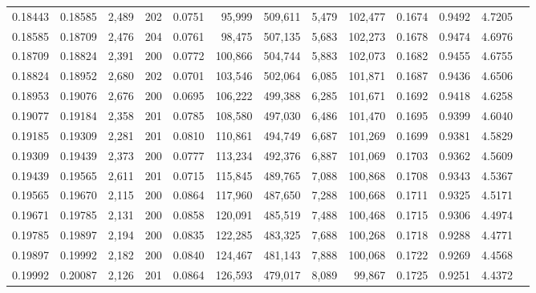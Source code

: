 \begin{tabular}{rrrrrrrrrrrrr}
0.18443 & 0.18585 & 2,489 & 202 &                                     0.0751 &  95,999 & 509,611 &   5,479 & 102,477 & 0.1674 & 0.9492 & 4.7205 \\
0.18585 & 0.18709 & 2,476 & 204 &                                     0.0761 &  98,475 & 507,135 &   5,683 & 102,273 & 0.1678 & 0.9474 & 4.6976 \\
0.18709 & 0.18824 & 2,391 & 200 &                                     0.0772 & 100,866 & 504,744 &   5,883 & 102,073 & 0.1682 & 0.9455 & 4.6755 \\
0.18824 & 0.18952 & 2,680 & 202 &                                     0.0701 & 103,546 & 502,064 &   6,085 & 101,871 & 0.1687 & 0.9436 & 4.6506 \\
0.18953 & 0.19076 & 2,676 & 200 &                                     0.0695 & 106,222 & 499,388 &   6,285 & 101,671 & 0.1692 & 0.9418 & 4.6258 \\
0.19077 & 0.19184 & 2,358 & 201 &                                     0.0785 & 108,580 & 497,030 &   6,486 & 101,470 & 0.1695 & 0.9399 & 4.6040 \\
0.19185 & 0.19309 & 2,281 & 201 &                                     0.0810 & 110,861 & 494,749 &   6,687 & 101,269 & 0.1699 & 0.9381 & 4.5829 \\
0.19309 & 0.19439 & 2,373 & 200 &                                     0.0777 & 113,234 & 492,376 &   6,887 & 101,069 & 0.1703 & 0.9362 & 4.5609 \\
0.19439 & 0.19565 & 2,611 & 201 &                                     0.0715 & 115,845 & 489,765 &   7,088 & 100,868 & 0.1708 & 0.9343 & 4.5367 \\
0.19565 & 0.19670 & 2,115 & 200 &                                     0.0864 & 117,960 & 487,650 &   7,288 & 100,668 & 0.1711 & 0.9325 & 4.5171 \\
0.19671 & 0.19785 & 2,131 & 200 &                                     0.0858 & 120,091 & 485,519 &   7,488 & 100,468 & 0.1715 & 0.9306 & 4.4974 \\
0.19785 & 0.19897 & 2,194 & 200 &                                     0.0835 & 122,285 & 483,325 &   7,688 & 100,268 & 0.1718 & 0.9288 & 4.4771 \\
0.19897 & 0.19992 & 2,182 & 200 &                                     0.0840 & 124,467 & 481,143 &   7,888 & 100,068 & 0.1722 & 0.9269 & 4.4568 \\
0.19992 & 0.20087 & 2,126 & 201 &                                     0.0864 & 126,593 & 479,017 &   8,089 &  99,867 & 0.1725 & 0.9251 & 4.4372 \\

\end{tabular}
